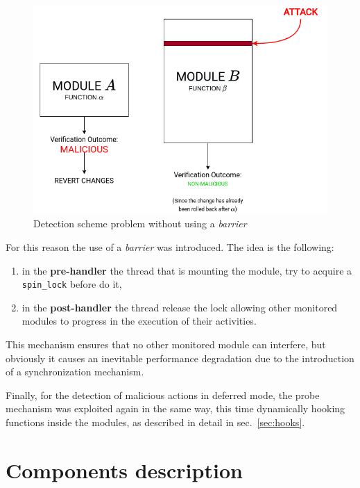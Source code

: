 \documentclass{article}
\begin{document}
	\begin{figure}[!htbp]
		\centering
		\includegraphics[scale=0.4]{concurrency}
		\caption{Detection scheme problem without using a \textit{barrier}}
		\label{fig:concurrency}
	\end{figure}

	For this reason the use of a \textit{barrier} was introduced. The idea is the following:
	\begin{enumerate}
		\item in the \textbf{pre-handler} the thread that is mounting the module, try to acquire a \texttt{spin\_lock}
		before do it,
		\item in the \textbf{post-handler} the thread release the lock allowing other monitored modules to progress in
		the execution of their activities.
	\end{enumerate}

	This mechanism ensures that no other monitored module can interfere, but obviously it causes an inevitable performance degradation due to the introduction of a synchronization mechanism.

	Finally, for the detection of malicious actions in deferred mode, the probe mechanism was exploited again in the
	same way, this time dynamically hooking functions inside the modules, as described in detail in
	sec.~\ref{sec:hooks}.

	\section{Components description}
\end{document}
